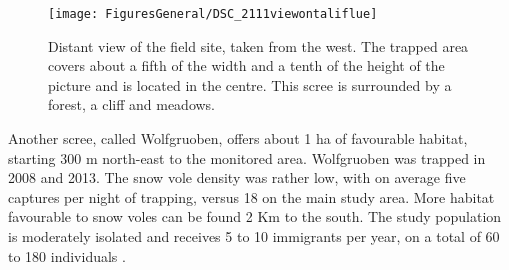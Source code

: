 \begin{figure}[ht]
	\texttt{[image: FiguresGeneral/DSC\_2111viewontaliflue]}
	\caption{Distant view of the field site, taken from the west. The trapped area covers about a fifth of the width and a tenth of the height of the picture and is located in the centre. This scree is surrounded by a forest, a cliff and meadows.}
	\label{fig:landscape}
\end{figure}
Another scree, called Wolfgruoben, offers about 1 ha of favourable habitat, starting 300 m north-east to the monitored area. Wolfgruoben was trapped in 2008 and 2013. The snow vole density was rather low, with on average five captures per night of trapping, versus 18 on the main study area. More habitat favourable to snow voles can be found 2 Km to the south. The study population is moderately isolated and receives 5 to 10 immigrants per year, on a total of 60 to 180 individuals \parencite{Garcia-Navas2016}. 


